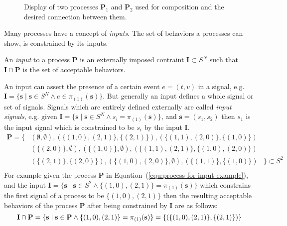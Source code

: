 \begin{figure}[htb]
\centering

\caption{\label{fig:example-tsm-composition}
  Display of two processes $\mathbf{P}_1$ and $\mathbf{P}_2$
  used for composition and the desired connection between them.}
\end{figure}

Many processes have a concept of \emph{inputs}. The set of behaviors
a processes can show, is constrained by its inputs.
\begin{sdefinition}
An \emph{input} to a process $\mathbf{P}$ is an externally
imposed contraint $\mathbf{I} \subset S^N$ such that
$\mathbf{I} \cap \mathbf{P}$ is the set of acceptable behaviors.
\end{sdefinition}
An input can assert the presence of a certain event $e = (t,v)$ in a signal,
e.g. $\mathbf{I} = \{\mathbf{s} \mid \mathbf{s} \in S^N \wedge e \in \pi{}_{(1)}(\mathbf{s}) \}$.
But generally an input defines a whole signal or set of signals.
Signals which are entirely defined externally are called \emph{input signals},
e.g. given $\mathbf{I} = \{\mathbf{s} \mid \mathbf{s} \in S^N \wedge s_i = \pi{}_{(1)}(\mathbf{s})\}$, and
$\mathbf{s} = (s_1, s_2)$ then $s_1$ is the input signal which
is constrained to be $s_i$ by the input $\mathbf{I}$.
\begin{equation}\label{equ:process-for-input-example}
\begin{array}{rll}
  \mathbf{P} = \{ & (\emptyset,\emptyset), (\{(1,0),(2,1)\},\{(2,1)\}), (\{(1,1),(2,0)\},\{(1,0)\})&\\
                  & (\{(2,0)\},\emptyset), (\{(1,0)\},\emptyset), (\{(1,1),(2,1)\},\{(1,0),(2,0)\})&\\
                  & (\{(2,1)\},\{(2,0)\}), (\{(1,0),(2,0)\},\emptyset), (\{(1,1)\},\{(1,0)\}) &\} \subset S^2\\
\end{array}
\end{equation}
For example given the process $\mathbf{P}$ in Equation~(\ref{equ:process-for-input-example}),
and the input $\mathbf{I} = \{\mathbf{s} \mid  \mathbf{s} \in S^2 \wedge \{(1,0),(2,1)\} = \pi{}_{(1)}(\mathbf{s})\}$
which constrains the first signal of a process to be $\{(1,0),(2,1)\}$ then
the resulting acceptable behaviors of the process $\mathbf{P}$ after being
constrained by $\mathbf{I}$ are as follows:
\begin{displaymath}
  \mathbf{I} \cap \mathbf{P} = \{\mathbf{s} \mid \mathbf{s} \in \mathbf{P} \wedge \{(1,0),(2,1)\} = \pi{}_{(1)}(\mathbf{s})\} =
                               \{(\{(1,0),(2,1)\},\{(2,1)\})\}\\
\end{displaymath}

